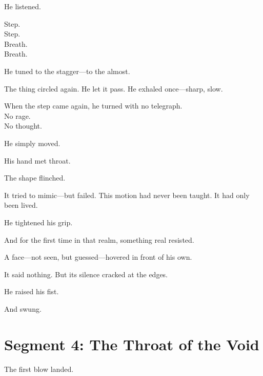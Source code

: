 \documentclass[9pt]{article}
\begin{document}
\vspace{0.5em}
He listened.

\vspace{0.5em}
Step.\\
Step.\\
Breath.\\
Breath.

\vspace{0.5em}
He tuned to the stagger---to the almost.

\vspace{0.5em}
The thing circled again. He let it pass. He exhaled once---sharp, slow.

\vspace{0.5em}
When the step came again, he turned with no telegraph.\\
No rage.\\
No thought.

\vspace{0.5em}
He simply moved.

\vspace{0.5em}
His hand met throat.

\vspace{0.5em}
The shape flinched.

\vspace{0.5em}
It tried to mimic---but failed. This motion had never been taught. It had only been lived.

\vspace{0.5em}
He tightened his grip.

\vspace{0.5em}
And for the first time in that realm, something real resisted.

\vspace{0.5em}
A face---not seen, but guessed---hovered in front of his own.

\vspace{0.5em}
It said nothing. But its silence cracked at the edges.

\vspace{0.5em}
He raised his fist.

\vspace{0.5em}
And swung.

\newpage

\section*{Segment 4: The Throat of the Void}

The first blow landed.
\end{document}
